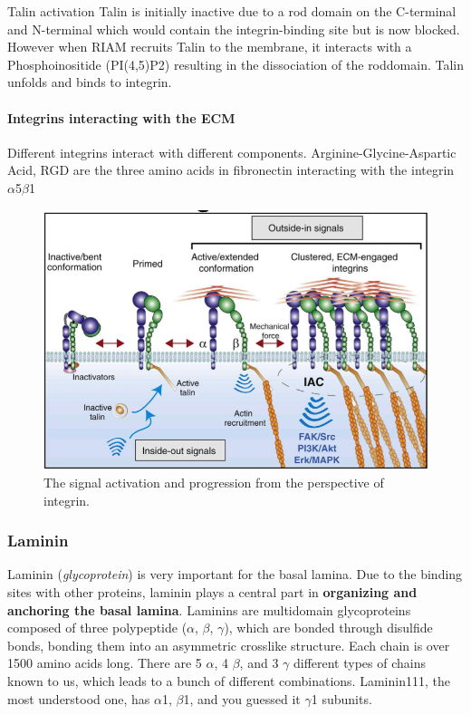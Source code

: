 \documentclass[../main.tex]{subfiles}
\begin{document}
\begin{RemarkWithTitel}{Talin activation}
	Talin is initially inactive due to a rod domain on the C-terminal and N-terminal which would contain the integrin-binding site but is now blocked. However when RIAM recruits Talin to the membrane, it interacts with a \gls{Phosphoinositide} (PI(4,5)P2) resulting in the dissociation of the \gls{roddomain}. Talin unfolds and binds to integrin.
\end{RemarkWithTitel}

\paragraph{Integrins interacting with the ECM}

Different integrins interact with different components. Arginine-Glycine-Aspartic Acid, RGD are the three amino acids in fibronectin interacting with the integrin $\alpha$5$\beta$1

\begin{figure}[H]
	\centering
	\includegraphics[width=0.5\linewidth]{int_sign}
	\caption{The signal activation and progression from the perspective of integrin.}
	\label{fig:intsign}
\end{figure}


\subsubsection{Laminin}

\gls{Laminin} (\textit{glycoprotein}) is very important for the basal lamina. Due to the binding sites with other proteins, laminin plays a central part in \textbf{organizing and anchoring the basal lamina}. Laminins are multidomain glycoproteins composed of three polypeptide ($\alpha$, $\beta$, $\gamma$), which are bonded through disulfide bonds, bonding them into an asymmetric crosslike structure. Each chain is over 1500 amino acids long. There are 5 $\alpha$, 4 $\beta$, and 3 $\gamma$ different types of chains known to us, which leads to a bunch of different combinations. \gls{Laminin111}, the most understood one, has $\alpha$1, $\beta$1, and you guessed it $\gamma$1 subunits. 
\end{document}
